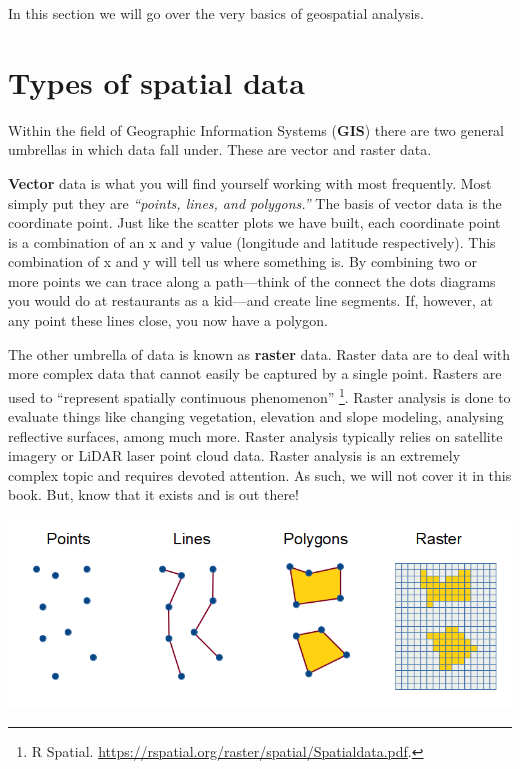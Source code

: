 \documentclass[
]{book}
\begin{document}
In this section we will go over the very basics of geospatial analysis.

\hypertarget{types-of-spatial-data}{%
\section{Types of spatial data}\label{types-of-spatial-data}}

Within the field of Geographic Information Systems (\textbf{GIS}) there are two general umbrellas in which data fall under. These are vector and raster data.

\textbf{Vector} data is what you will find yourself working with most frequently. Most simply put they are \emph{``points, lines, and polygons.''} The basis of vector data is the coordinate point. Just like the scatter plots we have built, each coordinate point is a combination of an x and y value (longitude and latitude respectively). This combination of x and y will tell us where something is. By combining two or more points we can trace along a path---think of the connect the dots diagrams you would do at restaurants as a kid---and create line segments. If, however, at any point these lines close, you now have a polygon.

The other umbrella of data is known as \textbf{raster} data. Raster data are to deal with more complex data that cannot easily be captured by a single point. Rasters are used to ``represent spatially continuous phenomenon'' \footnote{R Spatial. \url{https://rspatial.org/raster/spatial/Spatialdata.pdf}.}. Raster analysis is done to evaluate things like changing vegetation, elevation and slope modeling, analysing reflective surfaces, among much more. Raster analysis typically relies on satellite imagery or LiDAR laser point cloud data. Raster analysis is an extremely complex topic and requires devoted attention. As such, we will not cover it in this book. But, know that it exists and is out there!

\includegraphics{static/2019-points-lines-polygons.png}
\end{document}
